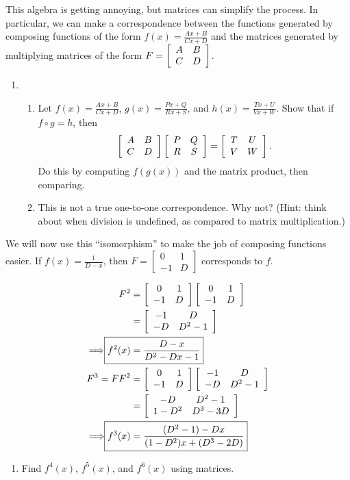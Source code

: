 \documentclass[../gatm.tex]{subfiles}
\begin{document}
This algebra is getting annoying, but matrices can simplify the process. In particular, we can make a correspondence between the functions generated by composing functions of the form $f(x)=\frac{Ax+B}{Cx+D}$ and the matrices generated by multiplying matrices of the form $F=\left[\begin{array}{cc} A & B \\ C & D \end{array}\right]$.

\begin{enumerate}
\setcounter{enumi}{\value{problem_i}}
\item \begin{enumerate}
\item Let $f(x)=\frac{Ax+B}{Cx+D}$, $g(x)=\frac{Px+Q}{Rx+S}$, and $h(x)=\frac{Tx+U}{Vx+W}$. Show that if $f\circ g = h$, then
$$\left[\begin{array}{cc} A & B \\ C & D \end{array}\right]\left[\begin{array}{cc} P & Q \\ R & S \end{array}\right]=\left[\begin{array}{cc} T & U \\ V & W \end{array}\right].$$
Do this by computing $f(g(x))$ and the matrix product, then comparing.
\item This is not a true one-to-one correspondence. Why not? (Hint: think about when division is undefined, as compared to matrix multiplication.)
\end{enumerate}
\setcounter{problem_i}{\value{enumi}}
\end{enumerate}

\noindent We will now use this ``isomorphism'' to make the job of composing functions easier. If $f(x)=\frac{1}{D-x}$, then $F=\left[\begin{smallmatrix} 0 & 1 \\ -1 & D \end{smallmatrix}\right]$ corresponds to $f$.

\begin{align*}
F^2 &= \twomat{0}{1}{-1}{D}\twomat{0}{1}{-1}{D} \\
&= \twomat{-1}{D}{-D}{D^2-1} \\
\Longrightarrow \Aboxed{f^2(x) &= \frac{D-x}{D^2-Dx-1}} \\
F^3 = FF^2 &= \twomat{0}{1}{-1}{D}\twomat{-1}{D}{-D}{D^2-1} \\
&= \twomat{-D}{D^2-1}{1-D^2}{D^3-3D} \\
\Longrightarrow \Aboxed{f^3(x) &= \frac{(D^2-1)-Dx}{(1-D^2)x+(D^3-2D)}} \\
\end{align*}

\begin{enumerate}
\setcounter{enumi}{\value{problem_i}}
\item Find $f^4(x)$, $f^5(x)$, and $f^6(x)$ using matrices.
\setcounter{problem_i}{\value{enumi}}
\end{enumerate}
\end{document}
